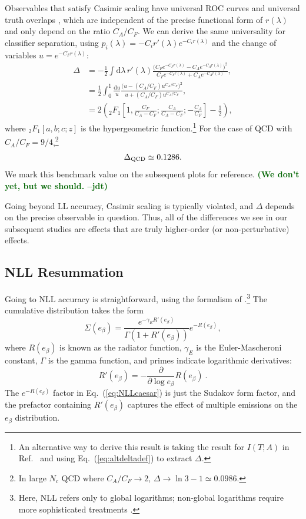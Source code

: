 \documentclass[11pt,letterpaper]{article}
\newcommand{\df}{\text{d}}
\DeclareRobustCommand{\Eq}[1]{Eq.~(\ref{#1})}
\DeclareRobustCommand{\Ref}[1]{Ref.~\cite{#1}}
\newcommand{\be}{\begin{equation}}
\newcommand{\ee}{\end{equation}}
\newcommand{\jdt}[1]{\textbf{\textcolor{darkgreen}{(#1 --jdt)}}}
\begin{document}
Observables that satisfy Casimir scaling have universal ROC curves \cite{} and universal truth overlaps \cite{}, which are independent of the precise functional form of $r(\lambda)$ and only depend on the ratio $C_A/C_F$.  We can derive the same universality for classifier separation, using $p_i(\lambda) = - C_i r'(\lambda) e^{-C_i r(\lambda)}$ and the change of variables $u = e^{-C_F r(\lambda)}$:
\begin{align}
\Delta &=  -\frac{1}{2} \int \df \lambda \, r'(\lambda) \frac{\bigl(C_F e^{-C_F r(\lambda)} - C_A e^{-C_A r(\lambda)}\bigr)^2}{C_F e^{-C_F r(\lambda)}+ C_A e^{-C_A r(\lambda)}} , \\
& = \frac{1}{2} \int_0^1 \frac{\df u}{u} \frac{\bigl(u - (C_A / C_F) u^{C_A/C_F}\bigr)^2}{u + (C_A/C_F) u^{C_A/C_F}} , \\
& = 2 \left({}_2F_1\left[1,\frac{C_F}{C_A - C_F}; \frac{C_A}{C_A - C_F}; - \frac{C_A}{C_F}\right] - \frac{1}{2}  \right),
\end{align}
where ${}_2F_1[a,b;c;z]$ is the hypergeometric function.\footnote{An alternative way to derive this result is taking the result for $I(T;A)$ in \Ref{Larkoski:2014pca} and using \Eq{eq:altdeltadef} to extract $\Delta$.}  For the case of QCD with $C_A/C_F = 9/4$,\footnote{In large $N_c$ QCD where $C_A/C_F \to 2$, $\Delta \to \ln 3 - 1 \simeq 0.0986$.}
\be
\Delta_{\rm QCD} \simeq  0.1286.
\ee
We mark this benchmark value on the subsequent plots for reference.  \jdt{We don't yet, but we should.}  

Going beyond LL accuracy, Casimir scaling is typically violated, and $\Delta$ depends on the precise observable in question.  Thus, all of the differences we see in our subsequent studies are effects that are truly higher-order (or non-perturbative) effects.

\subsection{NLL Resummation}

Going to NLL accuracy is straightforward, using the formalism of \cite{}.\footnote{Here, NLL refers only to global logarithms; non-global logarithms \cite{} require more sophisticated treatments \cite{}.}  The cumulative distribution takes the form
\be
\label{eq:NLLcaesar}
\Sigma(e_\beta) = \frac{e^{-\gamma_E R'(e_\beta)}}{\Gamma\left(1+R'(e_\beta)\right)} e^{-R(e_\beta)} ,
\ee
where $R(e_\beta)$ is known as the radiator function, $\gamma_E$ is the Euler-Mascheroni constant, $\Gamma$ is the gamma function, and primes indicate logarithmic derivatives:
\be
\label{eq:R_der}
R'(e_\beta) = -\frac{\partial}{\partial \log e_\beta} R(e_\beta) \ .
\ee
The $e^{-R(e_\beta)}$ factor in \Eq{eq:NLLcaesar} is just the Sudakov form factor, and the prefactor containing $R'(e_\beta)$ captures the effect of multiple emissions on the $e_\beta$ distribution.
\end{document}

